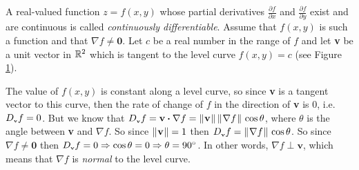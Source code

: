A real-valued function $z=f(x,y)$ whose partial derivatives $\tfrac{\partial f}{\partial x}$ and
$\frac{\partial f}{\partial y}$ exist and are continuous is called \emph{continuously differentiable}.
Assume that $f(x,y)$ is such a function and that $\nabla f \ne \textbf{0}$. Let $c$ be a real number in the range of
$f$ and let \textbf{v} be a unit vector in $\mathbb{R}^{2}$ which is tangent to the
level curve $f(x,y) = c$ (see Figure \ref{fig:gradlevel}).\vspace{-1mm}
\begin{figure}[h]
 \begin{center}
  \vspace{-4mm}
 \end{center}
 \caption[]{}
 \label{fig:gradlevel}
\end{figure}\vspace{-2mm}

The value of $f(x,y)$ is constant along a level curve, so since \textbf{v} is a tangent vector to this curve, then
the rate of change of $f$ in the direction of \textbf{v} is 0, i.e. $D_{\scriptscriptstyle \textbf{v}}f = 0$. But we know that
$D_{\scriptscriptstyle \textbf{v}}f = \textbf{v} \bm{\cdot} \nabla f = \lVert\mspace{1mu}\textbf{v}\mspace{1mu}\rVert\,\lVert\mspace{1mu}\nabla f\mspace{1mu}\rVert\,\cos \theta$,
where $\theta$ is the angle between \textbf{v} and $\nabla f$. So since $\lVert\mspace{1mu}\textbf{v}\mspace{1mu}\rVert = 1$ then
$D_{\scriptscriptstyle \textbf{v}}f = \lVert\mspace{1mu}\nabla f\mspace{1mu}\rVert\,\cos \theta$. So since $\nabla f \ne \textbf{0}$ then
$D_{\scriptscriptstyle \textbf{v}}f = 0 \Rightarrow \cos \theta = 0 \Rightarrow \theta = 90^\circ$. In other words, $\nabla f
\perp \textbf{v}$, which means that $\nabla f$ is \emph{normal} to the level curve.

